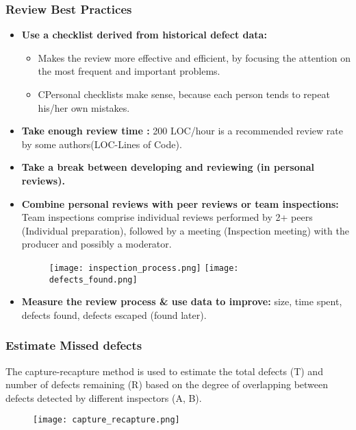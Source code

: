 \documentclass[../ESOF_notes.tex]{subfiles}
\begin{document}
\subsubsection{Review Best Practices}
\begin{itemize}
    \item \textbf{Use a checklist derived from historical defect data:}
          \begin{itemize}
              \item Makes the review more effective and efficient, by focusing
                    the attention on the most frequent and important problems. 
              \item CPersonal checklists make sense, because each person
                    tends to repeat his/her own mistakes.
                    
          \end{itemize}
    \item \textbf{Take enough review time :} 200 LOC/hour
          is a recommended review rate by some authors(LOC-Lines of Code).
    \item \textbf{Take a break between developing and reviewing
              (in personal reviews).}
    \item \textbf{Combine personal reviews with peer reviews or team
              inspections:} Team inspections comprise individual reviews 
          performed by 2+ peers (Individual preparation), followed 
          by a meeting (Inspection meeting) with the producer and 
          possibly a moderator.
          \begin{figure}[h!]
              \texttt{[image: inspection\_process.png]}
              \centering
              \texttt{[image: defects\_found.png]}
          \end{figure}
          \pagebreak
    \item \textbf{Measure the review process \& use data to improve:}
          size, time spent, defects found, defects escaped (found later).
\end{itemize}
\pagebreak
\subsubsection{Estimate Missed defects}

The capture-recapture method is used to estimate the total
defects (T) and number of defects remaining (R) based on
the degree of overlapping between defects detected by
different inspectors (A, B).
\begin{figure}[h!]
    \centering
    \texttt{[image: capture\_recapture.png]}
\end{figure}
\end{document}
